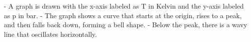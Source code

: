- A graph is drawn with the x-axis labeled as T in Kelvin and the y-axis labeled as p in bar.
- The graph shows a curve that starts at the origin, rises to a peak, and then falls back down, forming a bell shape.
- Below the peak, there is a wavy line that oscillates horizontally.